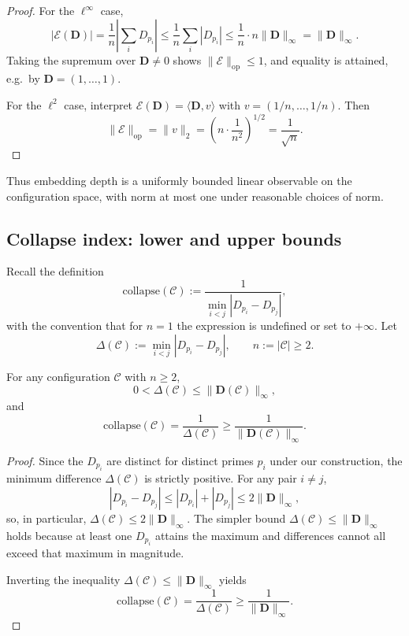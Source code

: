 \documentclass[11pt]{article}
\begin{document}
\begin{proof}
For the \(\ell^\infty\) case,
\[
  |\mathcal{E}(\mathbf{D})|
    = \frac{1}{n}\left|\sum_i D_{p_i}\right|
    \le \frac{1}{n} \sum_i |D_{p_i}|
    \le \frac{1}{n} \cdot n \|\mathbf{D}\|_\infty
    = \|\mathbf{D}\|_\infty.
\]
Taking the supremum over \(\mathbf{D}\neq 0\) shows \(\|\mathcal{E}\|_{\mathrm{op}}\le 1\), and equality is attained, e.g.\ by \(\mathbf{D} = (1,\dots,1)\).

For the \(\ell^2\) case, interpret \(\mathcal{E}(\mathbf{D}) = \langle \mathbf{D}, v\rangle\) with \(v=(1/n,\dots,1/n)\). Then
\[
  \|\mathcal{E}\|_{\mathrm{op}} = \|v\|_2 = \left(n\cdot \frac{1}{n^2}\right)^{1/2} = \frac{1}{\sqrt{n}}.
\]
\end{proof}

Thus embedding depth is a uniformly bounded linear observable on the configuration space, with norm at most one under reasonable choices of norm.

\subsection{Collapse index: lower and upper bounds}

Recall the definition
\[
  \mathrm{collapse}(\mathcal{C}) := \frac{1}{\min_{i<j}|D_{p_i} - D_{p_j}|},
\]
with the convention that for \(n=1\) the expression is undefined or set to \(+\infty\). Let
\[
  \Delta(\mathcal{C}) := \min_{i<j}|D_{p_i} - D_{p_j}|, \qquad n:=|\mathcal{C}|\ge 2.
\]

\begin{lemma}
For any configuration \(\mathcal{C}\) with \(n\ge 2\),
\[
  0 < \Delta(\mathcal{C}) \le \|\mathbf{D}(\mathcal{C})\|_\infty,
\]
and
\[
  \mathrm{collapse}(\mathcal{C})
    = \frac{1}{\Delta(\mathcal{C})}
    \ge \frac{1}{\|\mathbf{D}(\mathcal{C})\|_\infty}.
\]
\end{lemma}

\begin{proof}
Since the \(D_{p_i}\) are distinct for distinct primes \(p_i\) under our construction, the minimum difference \(\Delta(\mathcal{C})\) is strictly positive. For any pair \(i\neq j\),
\[
  |D_{p_i} - D_{p_j}| \le |D_{p_i}| + |D_{p_j}| \le 2\|\mathbf{D}\|_\infty,
\]
so, in particular, \(\Delta(\mathcal{C}) \le 2\|\mathbf{D}\|_\infty\). The simpler bound \(\Delta(\mathcal{C}) \le \|\mathbf{D}\|_\infty\) holds because at least one \(D_{p_i}\) attains the maximum and differences cannot all exceed that maximum in magnitude.

Inverting the inequality \(\Delta(\mathcal{C}) \le \|\mathbf{D}\|_\infty\) yields
\[
  \mathrm{collapse}(\mathcal{C})
    = \frac{1}{\Delta(\mathcal{C})} \ge \frac{1}{\|\mathbf{D}\|_\infty}.
\]
\end{proof}
\end{document}
